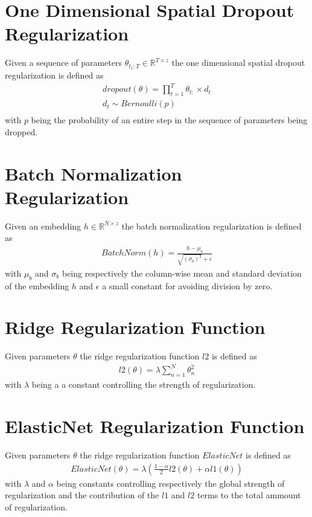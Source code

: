 \section{One Dimensional Spatial Dropout Regularization}
Given a sequence of parameters $\theta_{t_1:T} \in \mathbb{R}^{T \times z}$ the one dimensional spatial dropout regularization is defined as 
\begin{gather}
    \label{spatial_dropout}
    dropout(\theta) = \prod^T _{t=1} \theta_{t:} \times d_t \\ \nonumber
    d_t \sim Bernoulli(p) \\ \nonumber
\end{gather}
with $p$ being the probability of an entire step in the sequence of parameters being dropped. 

\section{Batch Normalization Regularization}
Given an embedding  $h \in \mathbb{R}^{N\times z}$ the batch normalization regularization is defined as 
\begin{gather}
    \label{batch_norm}
    BatchNorm(h) = \frac{h - \mu_b}{\sqrt{(\sigma_b)^2} + \epsilon}
\end{gather}
with $\mu_b$ and $\sigma_b$ being respectively the column-wise mean and standard deviation of the embedding $h$ and $\epsilon$ a small constant for avoiding division by zero.

\section{Ridge Regularization Function}
Given parameters $\theta$ the ridge regularization function $l2$ is defined as 
\begin{gather}
    \label{ridge}
    l2(\theta) = \lambda \sum_{n=1}^{N}\theta_n^2
\end{gather}
with $\lambda$ being a a constant controlling the strength of regularization.

\section{ElasticNet Regularization Function}
Given parameters $\theta$ the ridge regularization function $ElasticNet$ is defined as 
\begin{gather}
    \label{enet_reg}
    ElasticNet(\theta) = \lambda (\frac{1 - \alpha}{2}l2(\theta) + \alpha l1(\theta))
\end{gather}
with $\lambda$ and $\alpha$ being constants controlling respectively the global strength of regularization and the contribution of the $l1$ and $l2$ terms to the total ammount of regularization.

